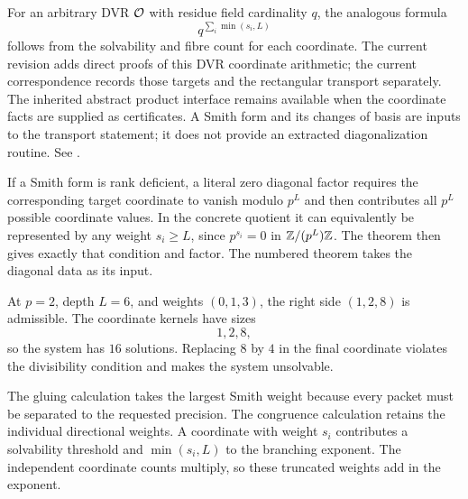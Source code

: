For an arbitrary DVR ${\mathcal O}$ with residue field cardinality $q$, the analogous
formula
\[
q^{\sum_i\min(s_i,L)}
\]
follows from the solvability and fibre count for each coordinate. The current
revision adds direct proofs of this DVR coordinate arithmetic; the current
correspondence records those targets and the rectangular transport separately.
The inherited abstract product interface remains available when the coordinate
facts are supplied as certificates. A Smith form and its changes of basis are
inputs to the transport statement; it does not provide an extracted
diagonalization routine. See \cite{Serre1979,Lang2002}.

If a Smith form is rank deficient, a literal zero diagonal factor requires
the corresponding target coordinate to vanish modulo $p^L$ and then
contributes all $p^L$ possible coordinate values. In the concrete quotient it
can equivalently be represented by any weight $s_i\ge L$, since
$p^{s_i}=0$ in $\mathbb Z/(p^L)\mathbb Z$. The theorem then gives exactly that condition and
factor. The numbered theorem takes the diagonal data as its input.

\begin{example}
At $p=2$, depth $L=6$, and weights $(0,1,3)$, the right side $(1,2,8)$ is admissible. The coordinate kernels have sizes
\[
1,2,8,
\]
so the system has $16$ solutions. Replacing $8$ by $4$ in the final coordinate violates the divisibility condition and makes the system unsolvable.
\end{example}

\begin{interpretation}
The gluing calculation takes the largest Smith weight because every packet must be separated to the requested precision. The congruence calculation retains the individual directional weights. A coordinate with weight $s_i$ contributes a solvability threshold and $\min(s_i,L)$ to the branching exponent. The independent coordinate counts multiply, so these truncated weights add in the exponent.
\end{interpretation}


